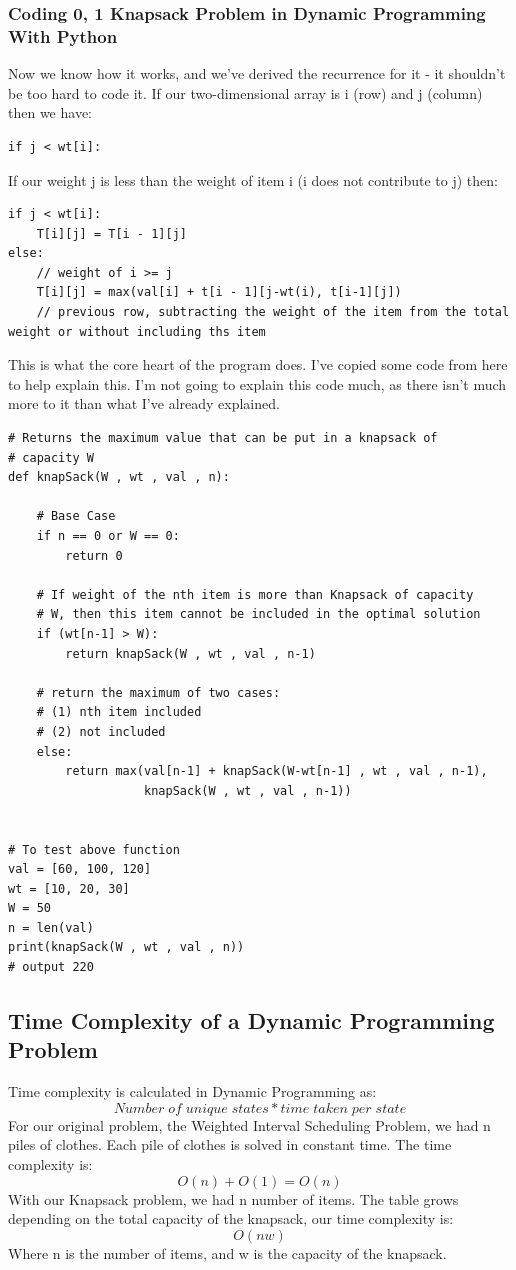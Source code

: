 \documentclass{article}
\begin{document}
\subsubsection{Coding {0, 1} Knapsack Problem in Dynamic Programming With Python}
Now we know how it works, and we've derived the recurrence for it - it shouldn't be too hard to code it. If our two-dimensional array is i (row) and j (column) then we have:
\begin{verbatim}
if j < wt[i]:
\end{verbatim}
If our weight j is less than the weight of item i (i does not contribute to j) then:
\begin{verbatim}
if j < wt[i]:
	T[i][j] = T[i - 1][j]
else:
	// weight of i >= j
    T[i][j] = max(val[i] + t[i - 1][j-wt(i), t[i-1][j])
    // previous row, subtracting the weight of the item from the total weight or without including ths item
\end{verbatim}
This is what the core heart of the program does. I've copied some code from here to help explain this. I'm not going to explain this code much, as there isn't much more to it than what I've already explained.
\begin{verbatim}
# Returns the maximum value that can be put in a knapsack of 
# capacity W 
def knapSack(W , wt , val , n): 
  
    # Base Case 
    if n == 0 or W == 0: 
        return 0
  
    # If weight of the nth item is more than Knapsack of capacity 
    # W, then this item cannot be included in the optimal solution 
    if (wt[n-1] > W): 
        return knapSack(W , wt , val , n-1) 
  
    # return the maximum of two cases: 
    # (1) nth item included 
    # (2) not included 
    else: 
        return max(val[n-1] + knapSack(W-wt[n-1] , wt , val , n-1), 
                   knapSack(W , wt , val , n-1)) 
  
  
# To test above function 
val = [60, 100, 120] 
wt = [10, 20, 30] 
W = 50
n = len(val) 
print(knapSack(W , wt , val , n))
# output 220
\end{verbatim}
\newpage
\subsection{Time Complexity of a Dynamic Programming Problem}
Time complexity is calculated in Dynamic Programming as:
$$Number \;of \;unique \;states * time \;taken \;per\; state$$
For our original problem, the Weighted Interval Scheduling Problem, we had n piles of clothes. Each pile of clothes is solved in constant time. The time complexity is:
$$O(n) + O(1) = O(n)$$
With our Knapsack problem, we had n number of items. The table grows depending on the total capacity of the knapsack, our time complexity is:
$$O(nw)$$
Where n is the number of items, and w is the capacity of the knapsack.
\end{document}

